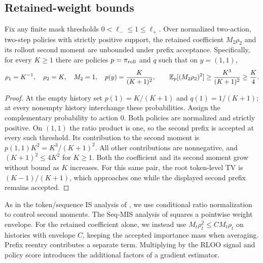 \subsection{Retained-weight bounds}
\begin{proposition}
\label{prop:prefix-weight-limit}
Fix any finite mask thresholds $0<\ell_-\le1\le\ell_+$.
Over normalized two-action, two-step policies with strictly positive
support, the retained coefficient $M_2\rho_2$ and its rollout second moment
are unbounded under prefix acceptance.
Specifically, for every $K\ge1$ there are policies $p=\pi_{\mathrm{roll}}$ and
$q$ such that on $y=(1,1)$,
\[
 \rho_1=K^{-1},\quad \rho_2=K,\quad M_2=1,\quad
 p(y)=\frac{K}{(K+1)^2},\qquad
 \mathbb{E}_p[(M_2\rho_2)^2]\ge\frac{K^3}{(K+1)^2}\ge\frac K4.
\]
\end{proposition}
\begin{proof}
At the empty history set $p(1)=K/(K+1)$ and $q(1)=1/(K+1)$;
at every nonempty history interchange these probabilities. Assign the
complementary probability to action $0$. Both policies are normalized and
strictly positive. On $(1,1)$ the ratio product is one, so the second prefix
is accepted at every such threshold. Its contribution to the second moment
is $p(1,1)K^2=K^3/(K+1)^2$. All other contributions are nonnegative, and
$(K+1)^2\le4K^2$ for $K\ge1$. Both the coefficient and its second moment
grow without bound as $K$ increases.
For this same pair, the root token-level TV is $(K-1)/(K+1)$,
which approaches one while the displayed second prefix remains accepted.
\end{proof}

As in the token/sequence IS analysis of
\citet[Analyses~1--2]{li2025tokensequence}, we use conditional ratio
normalization to control second moments. The Seq-MIS analysis of
\citet[Section~1.3]{li2025sequencemasking} squares a pointwise weight
envelope. For the retained coefficient alone, we instead use
$M_t\rho_t^2\le C M_t\rho_t$ on histories with envelope $C$, keeping the accepted
importance mass when averaging. Prefix reentry contributes a separate term.
Multiplying by the RLOO signal and policy score introduces the additional
factors of a gradient estimator.

